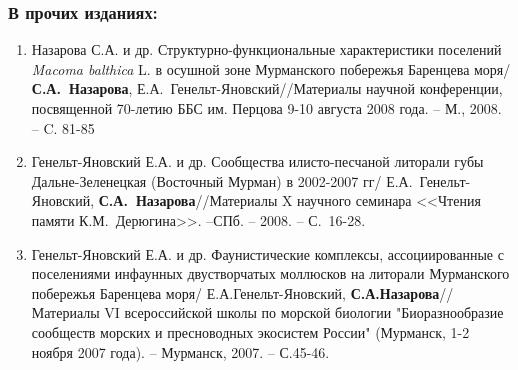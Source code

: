 {\begin{small}
\subsubsection*{В прочих изданиях:}
\begin{enumerate}
\item Назарова С.А. и др. Структурно-функциональные характеристики поселений \textit{Macoma balthica} L. в осушной зоне Мурманского побережья Баренцева моря/ \textbf{С.А.~Назарова}, Е.А.~Генельт-Яновский//Материалы научной конференции, посвященной 70-летию ББС им. Перцова 9-10 августа 2008 года. -- М., 2008. -- C. 81-85
\item Генельт-Яновский Е.А. и др. Сообщества илисто-песчаной литорали губы Дальне-Зеленецкая (Восточный Мурман) в 2002-2007 гг/ Е.А.~Генельт-Яновский, \textbf{С.А.~Назарова}//Материалы X научного семинара <<Чтения памяти К.М.~Дерюгина>>. --СПб. -- 2008. -- С.~16-28.
\item Генельт-Яновский Е.А. и др. Фаунистические комплексы, ассоциированные с поселениями инфаунных двустворчатых моллюсков на литорали Мурманского побережья Баренцева моря/ Е.А.Генельт-Яновский, \textbf{С.А.Назарова}// Материалы VI всероссийской школы по морской биологии "Биоразнообразие сообществ морских и пресноводных экосистем России" (Мурманск, 1-2 ноября 2007 года). -- Мурманск, 2007. -- С.45-46.
\end{enumerate}


\end{small}}
